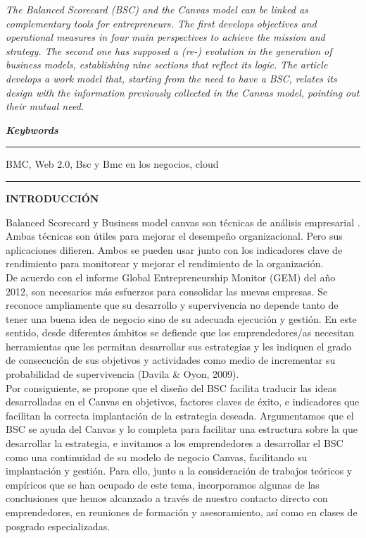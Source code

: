 \documentclass[10pt,a4paper]{article}
\begin{document}
		\textit{The Balanced Scorecard (BSC) and the Canvas model can be linked as complementary tools for entrepreneurs. The first develops objectives and operational measures in four main perspectives to achieve the mission and strategy. The second one has supposed a (re-) evolution in the generation of business models, establishing nine sections that reflect its logic. The article develops a work model that, starting from the need to have a BSC, relates its design with the information previously collected in the Canvas model, pointing out their mutual need.}
				
		\vspace{\baselineskip}
		
		\textbf{\textit{\large Keybwords}}\rule[1.5mm]{5mm}{0.1mm} BMC, Web 2.0, Bsc y Bmc en los negocios, cloud
						
		\rule{167mm}{0.1mm}
		
		\vspace{\baselineskip}
		
		\begin{center}
			\textbf{INTRODUCCIÓN}
		\end{center}
		
		
		
		Balanced Scorecard y Business model canvas son técnicas de análisis empresarial . Ambas técnicas son útiles para mejorar el desempeño organizacional. Pero sus aplicaciones difieren. Ambos se pueden usar junto con los indicadores clave de rendimiento para monitorear y mejorar el rendimiento de la organización.\\
		
		De acuerdo con el informe Global Entrepreneurship Monitor (GEM) del año 2012, son necesarios más esfuerzos para consolidar las nuevas empresas. Se reconoce ampliamente que su desarrollo y supervivencia no depende tanto de tener una buena idea de negocio sino de su adecuada ejecución y gestión. En este sentido, desde diferentes ámbitos se defiende que los emprendedores/as necesitan herramientas que les permitan desarrollar sus estrategias y les indiquen el grado de consecución de sus objetivos y actividades como medio de incrementar su probabilidad de supervivencia (Davila \& Oyon, 2009).\\
		
		Por consiguiente, se propone que el diseño del BSC facilita traducir las ideas desarrolladas en el Canvas en objetivos, factores claves de éxito, e indicadores que facilitan la correcta implantación de la estrategia deseada. Argumentamos que el BSC se ayuda del Canvas y lo completa para facilitar una estructura sobre la que desarrollar la estrategia, e invitamos a los emprendedores a desarrollar el BSC como una continuidad de su modelo de negocio Canvas, facilitando su implantación y gestión. Para ello, junto a la consideración de trabajos teóricos y empíricos que se han ocupado de este tema, incorporamos algunas de las conclusiones que hemos alcanzado a través de nuestro contacto directo con emprendedores, en reuniones de formación y asesoramiento, así como en clases de posgrado especializadas.
		
\end{document}
